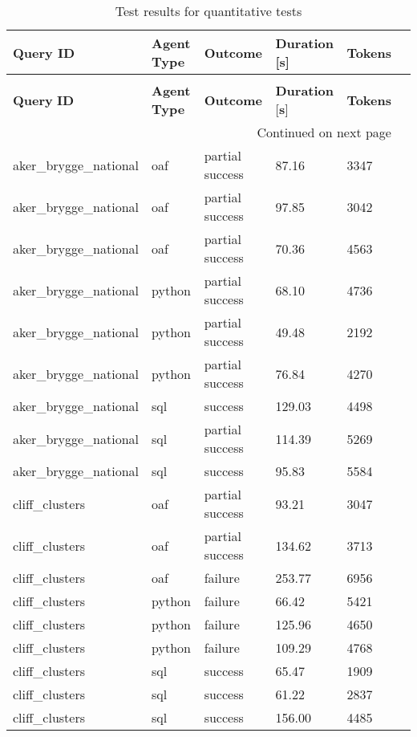 \begin{longtable}{lp{1.8cm}p{1.8cm}p{1.8cm}p{1.8cm}p{1.8cm}}
\caption{Test results for quantitative tests} \label{tbl:test-results-quantitative} \\
\toprule
\textbf{Query} \textbf{ID} & \textbf{Agent} \textbf{Type} & \textbf{Outcome} & \textbf{Duration} [\textbf{s}] & \textbf{Tokens} \\
\midrule
\endfirsthead
\caption[]{Test results for quantitative tests} \\
\toprule
\textbf{Query} \textbf{ID} & \textbf{Agent} \textbf{Type} & \textbf{Outcome} & \textbf{Duration} [\textbf{s}] & \textbf{Tokens} \\
\midrule
\endhead
\midrule
\multicolumn{5}{r}{Continued on next page} \\
\midrule
\endfoot
\bottomrule
\endlastfoot
aker\_brygge\_national & oaf & partial success & 87.16 & 3347 \\
aker\_brygge\_national & oaf & partial success & 97.85 & 3042 \\
aker\_brygge\_national & oaf & partial success & 70.36 & 4563 \\
aker\_brygge\_national & python & partial success & 68.10 & 4736 \\
aker\_brygge\_national & python & partial success & 49.48 & 2192 \\
aker\_brygge\_national & python & partial success & 76.84 & 4270 \\
aker\_brygge\_national & sql & success & 129.03 & 4498 \\
aker\_brygge\_national & sql & partial success & 114.39 & 5269 \\
aker\_brygge\_national & sql & success & 95.83 & 5584 \\
cliff\_clusters & oaf & partial success & 93.21 & 3047 \\
cliff\_clusters & oaf & partial success & 134.62 & 3713 \\
cliff\_clusters & oaf & failure & 253.77 & 6956 \\
cliff\_clusters & python & failure & 66.42 & 5421 \\
cliff\_clusters & python & failure & 125.96 & 4650 \\
cliff\_clusters & python & failure & 109.29 & 4768 \\
cliff\_clusters & sql & success & 65.47 & 1909 \\
cliff\_clusters & sql & success & 61.22 & 2837 \\
cliff\_clusters & sql & success & 156.00 & 4485 \\

\end{longtable}
